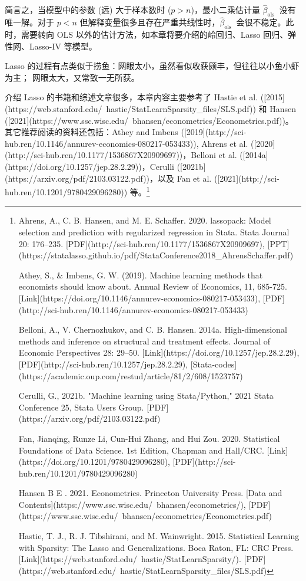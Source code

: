 简言之，当模型中的参数 (远) 大于样本数时 ($p>n$)，最小二乘估计量 $\widehat{\beta}_{\text {ols }}$ 没有唯一解。对于 $p<n$ 但解释变量很多且存在严重共线性时，$\widehat{\beta}_{\text {ols }}$ 会很不稳定。此时，需要转向 OLS 以外的估计方法，如本章将要介绍的岭回归、Lasso 回归、弹性网、Lasso-IV 等模型。 

Lasso 的过程有点类似于捞鱼：网眼太小，虽然看似收获颇丰，但往往以小鱼小虾为主；%
网眼太大，又常致一无所获。%


\vspace{4pt}

介绍 Lasso 的书籍和综述文章很多，本章内容主要参考了 Hastie et al. ([2015](https://web.stanford.edu/~hastie/StatLearnSparsity_files/SLS.pdf)) 和 Hansen ([2021](https://www.ssc.wisc.edu/~bhansen/econometrics/Econometrics.pdf))。其它推荐阅读的资料还包括：Athey and Imbens ([2019](http://sci-hub.ren/10.1146/annurev-economics-080217-053433)), Ahrens et al. ([2020](http://sci-hub.ren/10.1177/1536867X20909697))，Belloni et al. ([2014a](https://doi.org/10.1257/jep.28.2.29))，Cerulli ([2021b](https://arxiv.org/pdf/2103.03122.pdf))，以及 Fan et al. ([2021](http://sci-hub.ren/10.1201/9780429096280)) 等。\footnote{%
Ahrens, A., C. B. Hansen, and M. E. Schaffer. 2020. lassopack: Model selection and prediction with regularized regression in Stata. Stata Journal 20: 176–235. [PDF](http://sci-hub.ren/10.1177/1536867X20909697), [PPT](https://statalasso.github.io/pdf/StataConference2018_AhrensSchaffer.pdf)

Athey, S., \& Imbens, G. W. (2019). Machine learning methods that economists should know about. Annual Review of Economics, 11, 685-725. [Link](https://doi.org/10.1146/annurev-economics-080217-053433), [PDF](http://sci-hub.ren/10.1146/annurev-economics-080217-053433)

Belloni, A., V. Chernozhukov, and C. B. Hansen. 2014a. High-dimensional methods and inference on structural and
treatment effects. Journal of Economic Perspectives 28: 29–50. [Link](https://doi.org/10.1257/jep.28.2.29), [PDF](http://sci-hub.ren/10.1257/jep.28.2.29), [Stata-codes](https://academic.oup.com/restud/article/81/2/608/1523757)

Cerulli, G., 2021b. "Machine learning using Stata/Python," 2021 Stata Conference 25, Stata Users Group. [PDF](https://arxiv.org/pdf/2103.03122.pdf)

Fan, Jianqing, Runze Li, Cun-Hui Zhang, and Hui Zou. 2020. Statistical Foundations of Data Science. 1st Edition, Chapman and Hall/CRC. [Link](https://doi.org/10.1201/9780429096280), [PDF](http://sci-hub.ren/10.1201/9780429096280)

Hansen B E . 2021. Econometrics. Princeton University Press. [Data and Contents](https://www.ssc.wisc.edu/~bhansen/econometrics/), [PDF](https://www.ssc.wisc.edu/~bhansen/econometrics/Econometrics.pdf)

Hastie, T. J., R. J. Tibshirani, and M. Wainwright. 2015. Statistical Learning with Sparsity: The Lasso and
Generalizations. Boca Raton, FL: CRC Press. [Link](https://web.stanford.edu/~hastie/StatLearnSparsity/). [PDF](https://web.stanford.edu/~hastie/StatLearnSparsity_files/SLS.pdf) %
}
